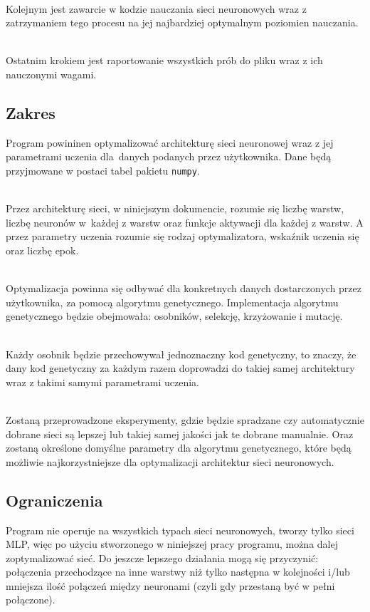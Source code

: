 \noindent\\
Kolejnym jest zawarcie w kodzie nauczania sieci neuronowych
wraz z zatrzymaniem tego procesu na jej najbardziej optymalnym poziomien nauczania.

\noindent\\
Ostatnim krokiem jest raportowanie wszystkich prób do pliku wraz
z ich nauczonymi wagami.


\subsection*{Zakres}
Program powininen optymalizować architekturę sieci neuronowej wraz
z jej parametrami uczenia dla~danych podanych przez użytkownika.
Dane będą przyjmowane w postaci tabel pakietu \texttt{numpy}.

\noindent\\
Przez architekturę sieci, w niniejszym dokumencie, rozumie się liczbę warstw,
liczbę neuronów w~każdej z warstw oraz funkcje aktywacji dla każdej z warstw.
A przez parametry uczenia rozumie się rodzaj optymalizatora,
wskaźnik uczenia się oraz liczbę epok.

\noindent\\
Optymalizacja powinna się odbywać dla konkretnych danych dostarczonych
przez uży\-tkownika, za pomocą algorytmu genetycznego.
Implementacja algorytmu genetycznego będzie obejmowała:
osobni\-ków, selekcję, krzyżowanie i mutację.

\noindent\\
Każdy osobnik będzie przechowywał jednoznaczny kod genetyczny, to znaczy,
że dany kod genetyczny za każdym razem doprowadzi do takiej samej architektury
wraz z takimi samymi parametrami uczenia.


\noindent\\
Zostaną przeprowadzone eksperymenty, gdzie będzie spradzane
czy automatycznie dobrane sieci są lepszej lub takiej samej jakości
jak te dobrane manualnie.
Oraz zostaną określone domyślne parametry dla algorytmu genetycznego,
które będą możliwie najkorzystniejsze dla optymalizacji architektur sieci neuronowych.

\subsection*{Ograniczenia}
Program nie operuje na wszystkich typach sieci neuronowych,
tworzy tylko sieci MLP, więc po użyciu stworzonego
w niniejszej pracy programu, można dalej zoptymalizować sieć.
Do jeszcze lepszego działania mogą się przyczynić:
połączenia przechodzące na inne warstwy niż tylko następna w kolejności
i/lub mniejsza ilość połączeń między neuronami (czyli gdy przestaną być w pełni połączone).

